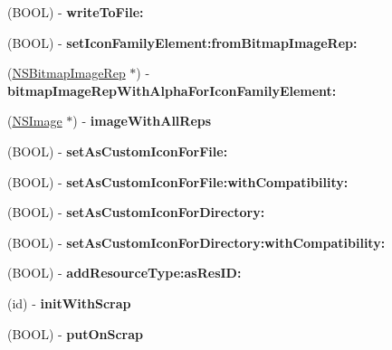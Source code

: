 \begin{DoxyCompactItemize}
\item 
\hypertarget{interface_icon_family_aa12df789afcc1f5a86b01610cb4bedc0}{
(BOOL) -\/ {\bfseries writeToFile:}}
\label{interface_icon_family_aa12df789afcc1f5a86b01610cb4bedc0}

\item 
\hypertarget{interface_icon_family_a25d1dfb46ec4901a75da76c243fe62d8}{
(BOOL) -\/ {\bfseries setIconFamilyElement:fromBitmapImageRep:}}
\label{interface_icon_family_a25d1dfb46ec4901a75da76c243fe62d8}

\item 
\hypertarget{interface_icon_family_a3109123b800c556ec184c684e4f15ae2}{
(\hyperlink{class_n_s_bitmap_image_rep}{NSBitmapImageRep} $\ast$) -\/ {\bfseries bitmapImageRepWithAlphaForIconFamilyElement:}}
\label{interface_icon_family_a3109123b800c556ec184c684e4f15ae2}

\item 
\hypertarget{interface_icon_family_adad71eb2223d699a610f99ad6b491012}{
(\hyperlink{class_n_s_image}{NSImage} $\ast$) -\/ {\bfseries imageWithAllReps}}
\label{interface_icon_family_adad71eb2223d699a610f99ad6b491012}

\item 
\hypertarget{interface_icon_family_a9a639593a57b615c85002ae87ccb9d0b}{
(BOOL) -\/ {\bfseries setAsCustomIconForFile:}}
\label{interface_icon_family_a9a639593a57b615c85002ae87ccb9d0b}

\item 
\hypertarget{interface_icon_family_ae17f7f8fa1557245a844d22cf49e3953}{
(BOOL) -\/ {\bfseries setAsCustomIconForFile:withCompatibility:}}
\label{interface_icon_family_ae17f7f8fa1557245a844d22cf49e3953}

\item 
\hypertarget{interface_icon_family_a74cb247f9bec97f465fa1295dec4f334}{
(BOOL) -\/ {\bfseries setAsCustomIconForDirectory:}}
\label{interface_icon_family_a74cb247f9bec97f465fa1295dec4f334}

\item 
\hypertarget{interface_icon_family_ae16c090adcf4ea7bc3a02d17696452e7}{
(BOOL) -\/ {\bfseries setAsCustomIconForDirectory:withCompatibility:}}
\label{interface_icon_family_ae16c090adcf4ea7bc3a02d17696452e7}

\item 
\hypertarget{interface_icon_family_a4f511c9491ceeda13cfcbaa17994eacb}{
(BOOL) -\/ {\bfseries addResourceType:asResID:}}
\label{interface_icon_family_a4f511c9491ceeda13cfcbaa17994eacb}

\item 
\hypertarget{interface_icon_family_acfbdad01cad94965ac3168c9331acac8}{
(id) -\/ {\bfseries initWithScrap}}
\label{interface_icon_family_acfbdad01cad94965ac3168c9331acac8}

\item 
\hypertarget{interface_icon_family_a5b8046103ec3aea2e6a5f9907574c304}{
(BOOL) -\/ {\bfseries putOnScrap}}
\label{interface_icon_family_a5b8046103ec3aea2e6a5f9907574c304}

\end{DoxyCompactItemize}
